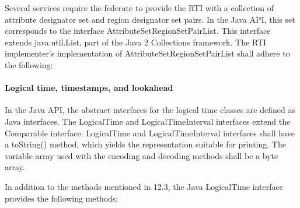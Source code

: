 \begin{compactstdpage}
    Several services require the federate to provide the RTI with a collection of attribute designator set and region designator set pairs. In the Java API, this set corresponds to the interface AttributeSetRegionSetPairList. This interface extends java.util.List, part of the Java 2 Collections framework. The RTI implementer's implementation of AttributeSetRegionSetPairList shall adhere to the following:


    \paragraph{Logical time, timestamps, and lookahead}

    In the Java API, the abstract interfaces for the logical time classes are defined as Java interfaces. The LogicalTime and LogicalTimeInterval interfaces extend the Comparable interface. LogicalTime and LogicalTimeInterval interfaces shall have a toString() method, which yields the representation suitable for printing. The variable array used with the encoding and decoding methods shall be a byte array.

    In addition to the methods mentioned in 12.3, the Java LogicalTime interface provides the following methods:

\end{compactstdpage}

\clearpage

